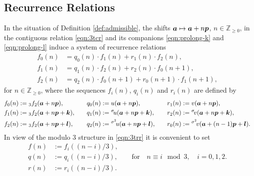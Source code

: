 \documentclass[a4paper,12pt]{article}
\theoremstyle{plain}
\def\Z{\mathbb{Z}}
\def\ba{\mbox{\boldmath $a$}}
\def\bk{\mbox{\boldmath $k$}}
\def\bl{\mbox{\boldmath $l$}}
\def\bp{\mbox{\boldmath $p$}}
\begin{document}
\subsection{Recurrence Relations} \label{subsec:rr}  
In the situation of Definition \ref{def:admissible}, the shifts $\ba \mapsto 
\ba + n \bp$, $n \in \Z_{\ge 0}$, in the contiguous relation \eqref{eqn:3tcr} 
and its companions \eqref{eqn:prolong-k} and \eqref{eqn:prolong-l} induce 
a system of recurrence relations     
\begin{subequations} \label{eqn:3trr}
\begin{align}
f_0(n) &= q_0(n) \cdot f_1(n) + r_1(n) \cdot f_2(n),  \label{eqn:3trr0} \\ 
f_1(n) &= q_1(n) \cdot f_2(n) + r_2(n) \cdot f_0(n+1), \label{eqn:3trr1} \\
f_2(n) &= q_2(n) \cdot f_0(n+1) + r_0(n+1) \cdot f_1(n+1),  \label{eqn:3trr2}
\end{align}
\end{subequations}
for $n \in \Z_{\ge 0}$, where the sequences $f_i(n)$, $q_i(n)$ and $r_i(n)$ are 
defined by  
\begin{alignat*}{3} 
f_0(n) &:= {}_3f_2(\ba + n \bp), \quad & 
q_0(n) &:= u(\ba + n \bp), \quad & 
r_1(n) &:= v(\ba + n \bp), \\
f_1(n) &:= {}_3f_2(\ba + n \bp + \bk), \quad & 
q_1(n) &:= {}^{\sigma}\!u(\ba + n \bp + \bk), \quad & 
r_2(n) &:= {}^{\sigma}\!v(\ba + n \bp + \bk), \\
f_2(n) &:= {}_3f_2(\ba + n \bp + \bl), \quad & 
q_2(n) &:= {}^{\sigma^2}\!u(\ba + n \bp + \bl), \quad & 
r_0(n) &:= {}^{\sigma^2}\!v(\ba + (n-1) \bp + \bl).             
\end{alignat*} 
In view of the modulo $3$ structure in \eqref{eqn:3trr} it is convenient to set      
\begin{subequations} \label{eqn:fqr}
\begin{align}
f(n) &:= f_i((n-i)/3),  \label{eqn:f(n)} \\ 
q(n) &:= q_i((n-i)/3), \qquad \mbox{for} \quad n \equiv i \mod 3, 
\quad i = 0,1,2.  \label{eqn:q(n)} \\ 
r(n) &:= r_i((n-i)/3).  \label{eqn:r(n)}
\end{align}  
\end{subequations} 
\end{document}
